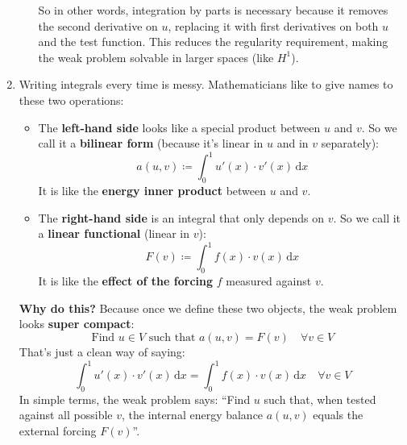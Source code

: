 \begin{enumerate}
\begin{itemize}
        So in other words, integration by parts is necessary because it removes the second derivative on $u$, replacing it with first derivatives on both $u$ and the test function. This reduces the regularity requirement, making the weak problem solvable in larger spaces (like $H^1$).
    \end{itemize}


    \item {} Writing integrals every time is messy. Mathematicians like to give names to these two operations:
    \begin{itemize}
        \item The \textbf{left-hand side} looks like a special product between $u$ and $v$. So we call it a \textbf{bilinear form} (because it's linear in $u$ and in $v$ separately):
        \begin{equation}
            a(u,v) \coloneq \int_0^1 u'(x) \cdot v'(x)\, \mathrm{d}x
        \end{equation}
        It is like the \textbf{energy inner product} between $u$ and $v$.

        \item The \textbf{right-hand side} is an integral that only depends on $v$. So we call it a \textbf{linear functional} (linear in $v$):
        \begin{equation}
            F(v) \coloneq \int_0^1 f(x) \cdot v(x)\, \mathrm{d}x
        \end{equation}
        It is like the \textbf{effect of the forcing} $f$ measured against $v$.
    \end{itemize}
    \textcolor{Green3}{ \textbf{Why do this?}} Because once we define these two objects, the weak problem looks \textbf{super compact}:
    \begin{equation}
        \text{Find } u \in V \text{ such that } a(u,v) = F(v) \quad \forall v \in V
    \end{equation}
    That's just a clean way of saying:
    \begin{equation*}
        \int_0^1 u'(x) \cdot v'(x)\, \mathrm{d}x = \int_0^1 f(x) \cdot v(x)\, \mathrm{d}x \quad \forall v \in V        
    \end{equation*}
    In simple terms, the weak problem says: ``Find $u$ such that, when tested against all possible $v$, the internal energy balance $a(u,v)$ equals the external forcing $F(v)$''.
\end{enumerate}
